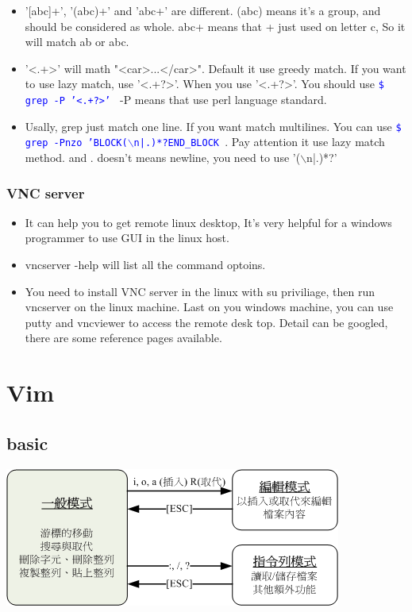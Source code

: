 \documentclass[a4paper,12pt,twoside]{book}
\newcommand{\linuxcommand}[1]{\texttt{\textcolor{blue}{\$ #1 \Pisymbol{psy}{191}}}}
\begin{document}
\begin{itemize}
\begin{tabular}{|p{}|p{}|p{}|}
\end{tabular}

\item '[abc]+',  '(abc)+' and 'abc+' are different.  (abc) means it's a group, and should be considered as whole. abc+ means that + just used on letter c, So it will match ab or abc.  

\item '<.+>' will math "<car>...</car>". Default it use greedy match. If you want to use lazy match, use '<.+?>'. When you use '<.+?>'.  You should use \linuxcommand{grep -P '<.+?>'} -P means that use perl language standard. 

\item Usally, grep just match one line. If you want match multilines. You can use \linuxcommand{grep -Pnzo 'BLOCK($\backslash$n|.)*?END\_BLOCK }.  Pay attention it use lazy match method. and . doesn't means newline, you need to use '($\backslash$n|.)*?'


\end{itemize}


\subsection{VNC server}
\begin{itemize}
 \item It can help you to get remote linux desktop, It's very helpful for a windows programmer to use GUI in the linux host.
 \item vncserver -help will list all the command optoins.
 \item  You need to install VNC server in the linux with su priviliage, then run vncserver on the linux machine. Last on you windows machine, you can use putty and vncviewer to access the remote desk top. Detail can be googled, there are some reference pages available.
\end{itemize}


\chapter{Vim}
\section{basic}

\includegraphics[scale=0.6]{pics/vi-mode} \\
\end{document}
